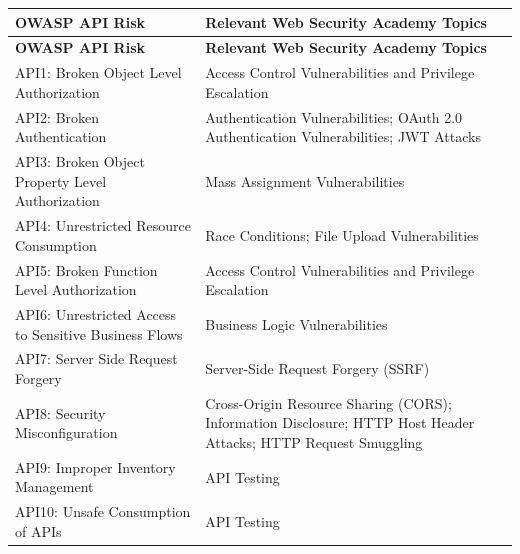 \documentclass[11pt,a4paper]{article}
\begin{document}
\begin{longtable}{p{} p{}}
    \toprule
    \textbf{OWASP API Risk} & \textbf{Relevant Web Security Academy Topics} \\
    \midrule
    \endfirsthead

    \toprule
    \textbf{OWASP API Risk} & \textbf{Relevant Web Security Academy Topics} \\
    \midrule
    \endhead

    API1: Broken Object Level Authorization
                            &
    Access Control Vulnerabilities and Privilege Escalation
    \\

    API2: Broken Authentication
                            &
    Authentication Vulnerabilities; OAuth 2.0 Authentication Vulnerabilities; JWT Attacks
    \\

    API3: Broken Object Property Level Authorization
                            &
    Mass Assignment Vulnerabilities
    \\

    API4: Unrestricted Resource Consumption
                            &
    Race Conditions; File Upload Vulnerabilities
    \\

    API5: Broken Function Level Authorization
                            &
    Access Control Vulnerabilities and Privilege Escalation
    \\

    API6: Unrestricted Access to Sensitive Business Flows
                            &
    Business Logic Vulnerabilities
    \\

    API7: Server Side Request Forgery
                            &
    Server-Side Request Forgery (SSRF)
    \\

    API8: Security Misconfiguration
                            &
    Cross-Origin Resource Sharing (CORS); Information Disclosure; HTTP Host Header Attacks; HTTP Request Smuggling
    \\

    API9: Improper Inventory Management
                            &
    API Testing
    \\

    API10: Unsafe Consumption of APIs
                            &
    API Testing
    \\

    \bottomrule
\end{longtable}
\end{document}
